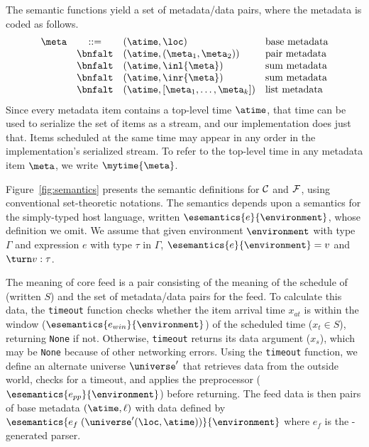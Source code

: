 The semantic functions yield a set of metadata/data pairs, where the 
metadata is coded as follows.
%
\[
\begin{array}{lcll} 
\meta & ::=     
& (\atime,\loc) & \mbox{base metadata} \\
& \bnfalt & (\atime,(\meta_1,\meta_2)) & \mbox{pair metadata} \\
& \bnfalt & (\atime,\inl{\meta}) & \mbox{sum metadata} \\
& \bnfalt & (\atime,\inr{\meta}) & \mbox{sum metadata} \\
& \bnfalt & (\atime,[\meta_1,\ldots,\meta_k]) & \mbox{list metadata} \\
\end{array}
\]  
%
Since every metadata item contains a top-level time $\atime$, that
time can be used to serialize the set of items as a stream, and 
our implementation does just that.  Items scheduled at the
same time may appear in any order in the implementation's
serialized stream.  To refer to the top-level time in any metadata
item $\meta$, we write $\mytime{\meta}$. 

Figure~\ref{fig:semantics} presents the semantic definitions for ${\cal
  C}$ and ${\cal F}$, using conventional set-theoretic notations.
The semantics depends upon a semantics for the simply-typed host
language, written $\esemantics{e}{\environment}$, whose definition we
omit. We assume that given environment $\environment$ with type
$\Gamma$ and expression $e$ with type $\tau$ in $\Gamma$,
$\esemantics{e}{\environment} = v$ and $\turn v : \tau$.

The meaning of core feed \corefeed{} is a pair consisting of the
meaning of the schedule of \corefeed{} (written $S$) and the set of
metadata/data pairs for the feed. To calculate this data, the
\texttt{timeout} function checks whether the item arrival time
$x_{at}$ is within the window ($\esemantics{e_{win}}{\environment}$)
of the scheduled time ($x_t \in S$), returning \texttt{None} if
not. Otherwise, \texttt{timeout} returns its data argument ($x_s$),
which may be {\tt None} because of other networking errors.  Using the
\texttt{timeout} function, we define an alternate universe
$\universe'$ that retrieves data from the outside world, checks for a
timeout, and applies the preprocessor
($\esemantics{e_{pp}}{\environment}$) before returning.  The feed data
is then pairs of base metadata $(\atime,\ell)$ with data defined by
$\esemantics{e_{f} \; (\universe'(\loc,\atime))}{\environment}$ where
$e_f$ is the \pads{}-generated parser.



